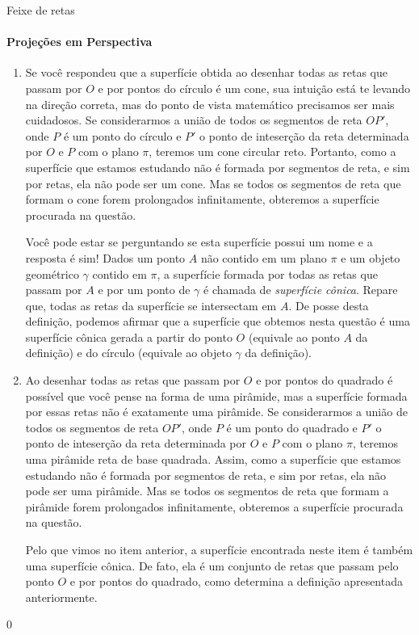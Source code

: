\begin{answer}{Feixe de retas}
{
\paragraph{Projeções em Perspectiva}
\begin{enumerate}
\item Se você respondeu que a superfície obtida ao desenhar todas as retas que passam por \(O\) e por pontos do círculo é um cone, sua intuição está te levando na direção correta, mas do ponto de vista matemático precisamos ser mais cuidadosos. Se considerarmos  a união de todos os segmentos de reta \(OP'\), onde \(P\) é um ponto do círculo e \(P'\) o ponto de inteserção da reta determinada por \(O\) e \(P\) com o plano \(\pi\), teremos um cone circular reto. Portanto, como a superfície que estamos estudando não é formada por segmentos de reta, e sim por retas, ela não pode ser um cone. Mas se todos os segmentos de reta que formam o cone forem prolongados infinitamente, obteremos a superfície procurada na questão.

Você pode estar se perguntando se esta superfície possui um nome e a resposta é sim! Dados um ponto \(A\) não contido em um plano \(\pi\) e um objeto geométrico \(\gamma\) contido em \(\pi\), a superfície formada por todas as retas que passam por \(A\) e por um ponto de \(\gamma\) é chamada de \textit{superfície cônica}. Repare que, todas as retas da superfície se intersectam em \(A\). De posse desta definição, podemos afirmar que a superfície que obtemos nesta questão é uma superfície cônica gerada a partir do ponto \(O\) (equivale ao ponto \(A\) da definição) e do círculo (equivale ao objeto \(\gamma\) da definição).

\item {} 
Ao desenhar todas as retas que passam por \(O\) e por pontos do quadrado é possível que você pense na forma de uma pirâmide, mas a superfície formada por essas retas não é exatamente uma pirâmide. Se considerarmos  a união de todos os segmentos de reta \(OP'\), onde \(P\) é um ponto do quadrado e \(P'\) o ponto de inteserção da reta determinada por \(O\) e \(P\) com o plano \(\pi\), teremos uma pirâmide reta de base quadrada. Assim, como a superfície que estamos estudando não é formada por segmentos de reta, e sim por retas, ela não pode ser uma pirâmide. Mas se todos os segmentos de reta que formam a pirâmide forem prolongados infinitamente, obteremos a superfície procurada na questão.

Pelo que vimos no item anterior, a superfície encontrada neste item é também uma superfície cônica. De fato, ela é um conjunto de retas que passam pelo ponto \(O\) e por pontos do quadrado, como determina a definição apresentada anteriormente.
\end{enumerate}
}{0}
\end{answer}

